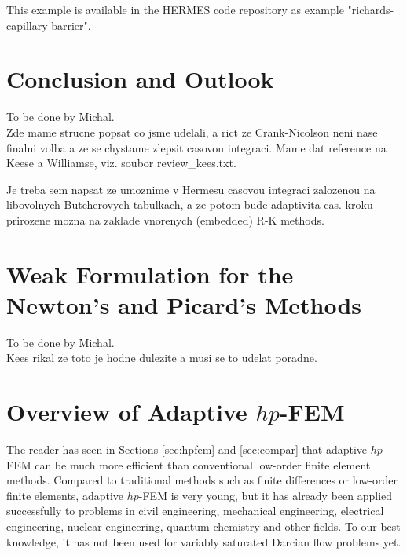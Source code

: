 \documentclass[final,3p,times,twocolumn]{elsarticle}
\begin{document}
This example is available in the HERMES code repository \cite{hermes-repo}
as example "richards-capillary-barrier".



\section{Conclusion and Outlook} \label{sec:8}

To be done by Michal.\\

Zde mame strucne popsat co jsme udelali, a rict ze
Crank-Nicolson neni nase finalni volba a ze se 
chystame zlepsit casovou integraci. Mame dat reference
na Keese a Williamse, viz. soubor review\_kees.txt.

Je treba sem napsat ze umoznime v Hermesu casovou integraci 
zalozenou na libovolnych Butcherovych tabulkach,
a ze potom bude adaptivita cas. kroku prirozene 
mozna na zaklade vnorenych (embedded) R-K methods. 





\section{Weak Formulation for the Newton's and Picard's Methods}\label{sec:9}

To be done by Michal.\\

Kees rikal ze toto je hodne dulezite a musi se to udelat poradne. 


\appendix

\section{Overview of Adaptive $hp$-FEM}
\label{sec:methods}



The reader has seen in Sections \ref{sec:hpfem} and \ref{sec:compar}
that adaptive $hp$-FEM can be much more efficient than 
conventional low-order finite element methods. Compared to 
traditional methods such as finite differences or low-order finite 
elements, adaptive $hp$-FEM is very young, but 
it has already been applied successfully to problems in civil
engineering, mechanical engineering, electrical engineering, 
nuclear engineering, quantum chemistry and other fields. To our best 
knowledge, it has not been used for variably saturated Darcian 
flow problems yet.
\end{document}
